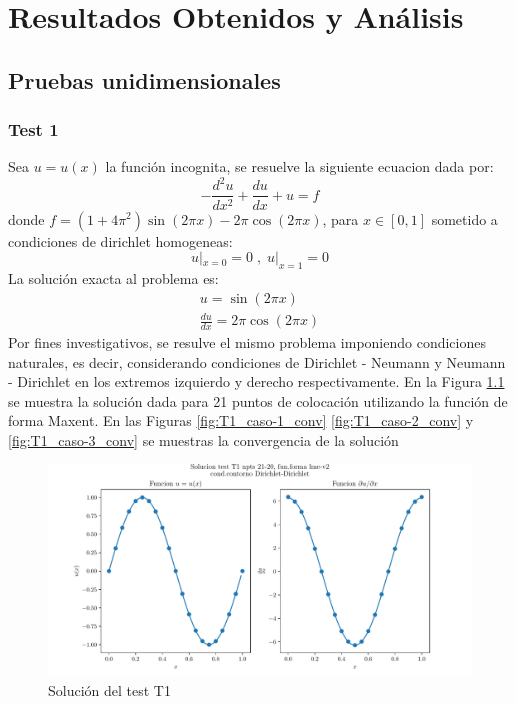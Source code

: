 \chapter{Resultados Obtenidos y Análisis}

\section{Pruebas unidimensionales}

\subsection{Test 1}
Sea $u=u(x)$ la función incognita, se resuelve la siguiente ecuacion dada por:
\begin{equation}
    -\frac{d^2u}{dx^2} + \frac{du}{dx} + u = f
\end{equation}
donde $f= (1+4\pi^2) \sin(2\pi x) - 2\pi\cos(2\pi x)$, para $x \in [0,1]$ sometido a condiciones de dirichlet homogeneas:
\begin{equation}
 u|_{x=0} = 0 \; , \; u|_{x=1}=0
\end{equation}
La solución exacta al problema es:
\begin{eqnarray}
    u = \sin( 2 \pi x ) \\
    \frac{du}{dx} = 2 \pi \cos( 2 \pi x )
\end{eqnarray}
Por fines investigativos, se resulve el mismo problema imponiendo condiciones naturales, es decir, considerando condiciones de Dirichlet - Neumann y Neumann - Dirichlet en los extremos izquierdo y derecho respectivamente. En la Figura \ref{fig:T1_caso-1_sol} se muestra la solución dada para 21 puntos de colocación utilizando la función de forma Maxent. En las Figuras \ref{fig:T1_caso-1_conv} \ref{fig:T1_caso-2_conv} y \ref{fig:T1_caso-3_conv} se muestras la convergencia de la solución
\begin{figure}
    \centering
    \includegraphics[width=1\textwidth]{./Imagenes/06/solucion/T1_21-20_regular_type-2_caso-1_lme-v2_direct_dgesv-lapack-blas.pdf}
    \caption{Solución del test T1} \label{fig:T1_caso-1_sol}
\end{figure}
